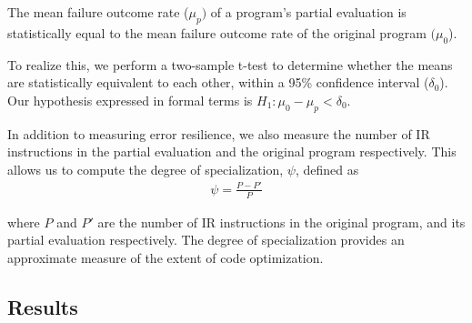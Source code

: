 \begin{hyp}
  \label{hyp:hypothesis}
  The mean failure outcome rate ($\mu_p)$ of a program's partial evaluation is statistically equal to the mean failure outcome rate of the original program $(\mu_0$).
\end{hyp}

To realize this, we perform a two-sample t-test to determine whether the means are statistically equivalent to each other, within a 95\% confidence interval ($\delta_0$).
Our hypothesis expressed in formal terms is $H_1: \mu_0 - \mu_p < \delta_0 $.

In addition to measuring error resilience, we also measure the number of IR instructions in the partial evaluation and the original program respectively.
This allows us to compute the degree of specialization, $\psi$, defined as
\begin{align*}
\psi = \frac{P - P'}{P}
\end{align*}

where $P$ and $P'$ are the number of IR instructions in the original program, and its partial evaluation respectively.
The degree of specialization provides an approximate measure of the extent of code optimization.


\subsection{Results}
\label{sec:results}

